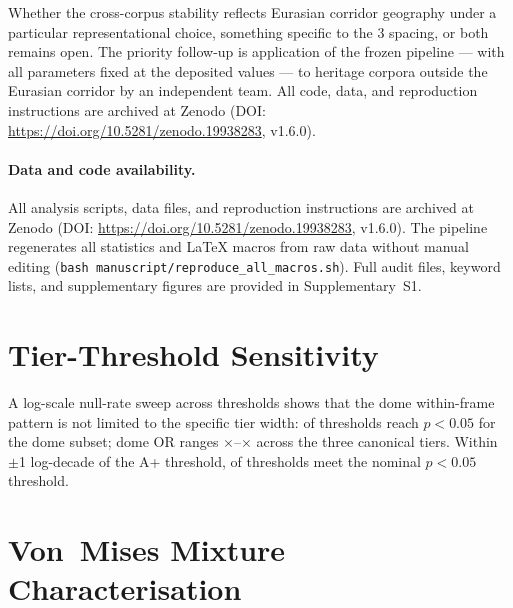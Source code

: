 \documentclass[12pt,a4paper]{article}
\newcommand{\degr}{\ifmmode{^\circ}\else\textdegree{}\fi}
\begin{document}
Whether the cross-corpus stability reflects Eurasian corridor
geography under a particular representational choice, something
specific to the 3\degr{} spacing, or both remains open. The priority
follow-up is application of the frozen pipeline — with all parameters
fixed at the deposited values — to heritage corpora outside the Eurasian
corridor by an independent team. All code, data, and reproduction
instructions are archived at Zenodo (DOI:
\url{https://doi.org/10.5281/zenodo.19938283}, v1.6.0).


\paragraph{Data and code availability.}
\label{sec:data_code}
All analysis scripts, data files, and reproduction instructions are
archived at Zenodo (DOI: \url{https://doi.org/10.5281/zenodo.19938283},
v1.6.0). The pipeline regenerates all statistics and LaTeX macros from
raw data without manual editing
(\texttt{bash manuscript/reproduce\_all\_macros.sh}). Full audit files,
keyword lists, and supplementary figures are provided in
Supplementary~S1.


\appendix

\section{Tier-Threshold Sensitivity}
\label{app:tier_sensitivity}

A log-scale null-rate sweep across \logSweepNtaus{} thresholds shows
that the dome within-frame pattern is not limited to the specific tier
width: \logSweepNsig{} of \logSweepNtaus{} thresholds reach $p < 0.05$
for the dome subset; dome OR ranges
\logSweepMinEnrichCanon{}$\times$--\logSweepMaxEnrichCanon{}$\times$
across the three canonical tiers. Within $\pm$1 log-decade of the A+
threshold, \logSweepAregionNsig{} of \logSweepAregionNtaus{} thresholds
meet the nominal $p < 0.05$ threshold.

\section{Von~Mises Mixture Characterisation}
\label{app:vonmises}
\end{document}
